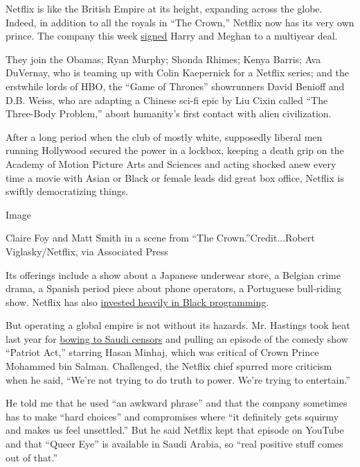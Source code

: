 Netflix is like the British Empire at its height, expanding across the
globe. Indeed, in addition to all the royals in ``The Crown,'' Netflix
now has its very own prince. The company this week
\href{https://www.nytimes3xbfgragh.onion/2020/09/02/business/media/harry-meghan-netflix.html}{signed}
Harry and Meghan to a multiyear deal.

They join the Obamas; Ryan Murphy; Shonda Rhimes; Kenya Barris; Ava
DuVernay, who is teaming up with Colin Kaepernick for a Netflix series;
and the erstwhile lords of HBO, the ``Game of Thrones'' showrunners
David Benioff and D.B. Weiss, who are adapting a Chinese sci-fi epic by
Liu Cixin called ``The Three-Body Problem,'' about humanity's first
contact with alien civilization.

After a long period when the club of mostly white, supposedly liberal
men running Hollywood secured the power in a lockbox, keeping a death
grip on the Academy of Motion Picture Arts and Sciences and acting
shocked anew every time a movie with Asian or Black or female leads did
great box office, Netflix is swiftly democratizing things.

Image

Claire Foy and Matt Smith in a scene from ``The Crown.''Credit...Robert
Viglasky/Netflix, via Associated Press

Its offerings include a show about a Japanese underwear store, a Belgian
crime drama, a Spanish period piece about phone operators, a Portuguese
bull-riding show. Netflix has also
\href{https://www.nytimes3xbfgragh.onion/2020/07/05/business/media/netflix-hollywood-black-culture.html}{invested
heavily in Black programming}.

But operating a global empire is not without its hazards. Mr. Hastings
took heat last year for
\href{https://www.nytimes3xbfgragh.onion/2019/01/06/business/media/netflix-saudi-arabia-censorship-hasan-minhaj.html}{bowing
to Saudi censors} and pulling an episode of the comedy show ``Patriot
Act,'' starring Hasan Minhaj, which was critical of Crown Prince
Mohammed bin Salman. Challenged, the Netflix chief spurred more
criticism when he said, ``We're not trying to do truth to power. We're
trying to entertain.''

He told me that he used ``an awkward phrase'' and that the company
sometimes has to make ``hard choices'' and compromises where ``it
definitely gets squirmy and makes us feel unsettled.'' But he said
Netflix kept that episode on YouTube and that ``Queer Eye'' is available
in Saudi Arabia, so ``real positive stuff comes out of that.''

